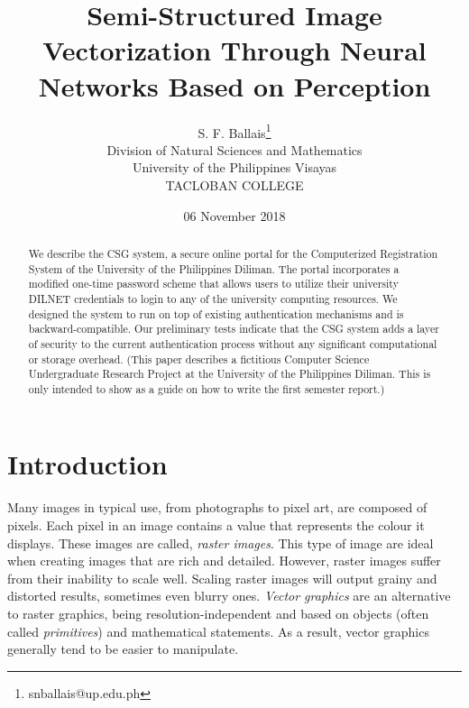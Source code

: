 \documentclass[12pt]{article}
\title{Semi-Structured Image Vectorization Through Neural Networks Based on Perception}
\author{S. F. Ballais\thanks{snballais@up.edu.ph}\\
Division of Natural Sciences and Mathematics\\
University of the Philippines Visayas \\
TACLOBAN COLLEGE}
\date{06 November 2018}
\begin{document}
\maketitle
\tableofcontents

\pagebreak

\begin{abstract}
We describe the CSG system, a secure online portal for the Computerized Registration System of the University of the Philippines Diliman. The portal incorporates a modified one-time password scheme that allows users to utilize their university DILNET credentials to login to any of the university computing resources. We designed the system to run on top of existing authentication mechanisms and is backward-compatible. Our preliminary tests indicate that the CSG system adds a layer of security to the current authentication process without any significant computational or storage overhead.  (This paper describes a fictitious Computer Science Undergraduate Research Project at the University of the Philippines Diliman. This is only intended to show as a guide on how to write the first semester report.)
\end{abstract}


\section{Introduction}
Many images in typical use, from photographs to pixel art, are composed of pixels. Each pixel in an image contains a value that represents the colour it displays. These images are called, \textit{raster images}. This type of image are ideal when creating images that are rich and detailed. However, raster images suffer from their inability to scale well. Scaling raster images will output grainy and distorted results, sometimes even blurry ones\cite{rastervsvectorgraphics}. \textit{Vector graphics} are an alternative to raster graphics, being resolution-independent and based on objects (often called \textit{primitives}) and mathematical statements\cite{barendrecht2018locally}\cite{rastervsvector}. As a result, vector graphics generally tend to be easier to manipulate\cite{barendrecht2018locally}.
\end{document}
